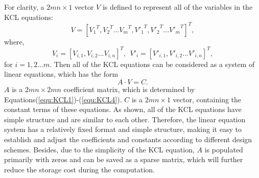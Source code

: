 For clarity, a ${2mn\times 1}$ vector ${V}$ is defined to represent all of the variables in the KCL equations:
\begin{equation}\label{equ:V1}
{V}=[{V_1}^T,{V_2}^T...{V_m}^T,{V'_1}^T,{V'_2}^T...{V'_m}^T]^T,
\end{equation}
where,
\begin{equation}\label{equ:V2}
{V_i} = [V_{i,1},V_{i,2}...V_{i,n}]^T,~~{V'_i} = [V'_{i,1},V'_{i,2}...V'_{i,n}]^T,
\end{equation}
for $i=1,2...m$. Then all of the KCL equations can be considered as a
system of linear equations, which has the form
\begin{equation}\label{equ:matrix}
A\cdot V = C.
\end{equation}
$A$ is a ${2mn\times{2mn}}$ coefficient matrix, which is determined by
Equations(\ref{equ:KCL1})-(\ref{equ:KCL4}). $C$ is a ${2mn\times{1}}$
vector, containing the constant terms of these equations. As shown, all of
the KCL equations have simple structure and are similar to each
other. Therefore, the linear equation system has a relatively fixed format
and simple structure, making it easy to establish and adjust the
coefficients and constants according to different design schemes. Besides,
due to the simplicity of the KCL equation, $A$ is populated primarily with
zeros and can be saved as a sparse matrix, which will further reduce the
storage cost during the computation.

